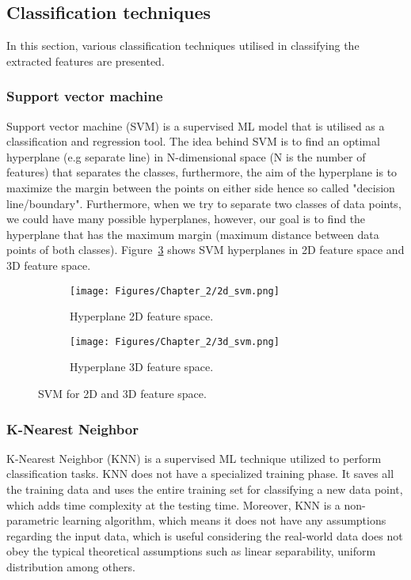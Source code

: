 \subsection{Classification techniques}
In this section, various classification techniques utilised in classifying the extracted features are presented.
\subsubsection{Support vector machine}
Support vector machine (SVM) is a supervised ML model that is utilised as a classification and regression tool.  
The idea behind SVM is to find an optimal hyperplane (e.g separate line) in N-dimensional space (N is the number of features) that separates the classes, furthermore, the aim of the hyperplane is to maximize the margin between the points on either side hence so called "decision line/boundary".
Furthermore, when we try to separate two classes of data points, we could have many possible hyperplanes, however, our goal is to find the hyperplane that has the maximum margin (maximum distance between data points of both classes). 
Figure~\ref{fig:SVM} shows SVM hyperplanes in 2D feature space and 3D feature space.
\begin{figure}[!ht]
	\centering
	\begin{subfigure}[b]{0.40\textwidth}		
		\texttt{[image: Figures/Chapter\_2/2d\_svm.png]}
		\caption{Hyperplane 2D feature space.}
		\label{fig:2dsvm}
	\end{subfigure}
	\begin{subfigure}[b]{0.49\textwidth}
		\texttt{[image: Figures/Chapter\_2/3d\_svm.png]}
		\caption{Hyperplane 3D feature space.} 
		\label{fig:3dsvm}
	\end{subfigure}	
	\caption{SVM for 2D and 3D feature space.}
	\label{fig:SVM}
\end{figure}
\subsubsection{K-Nearest Neighbor}
K-Nearest Neighbor (KNN) is a supervised ML technique utilized to perform classification tasks.
KNN does not have a specialized training phase.
It saves all the training data and uses the entire training set for classifying a new data point, which adds time complexity at the testing time.
Moreover, KNN is a non-parametric learning algorithm, which means it does not have any assumptions regarding the input data, which is useful considering the real-world data does not obey the typical theoretical assumptions such as linear separability, uniform distribution among others.

